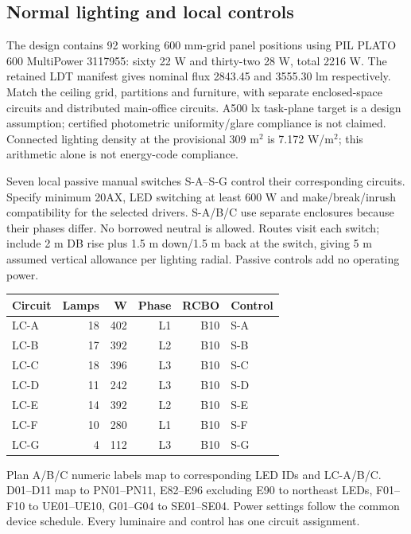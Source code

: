 {\fontsize{12}{14}\selectfont\tenantselection}
\subsection*{Normal lighting and local controls}
The design contains 92 working 600 mm-grid panel positions using PIL PLATO 600 MultiPower 3117955: sixty 22 W and thirty-two 28 W, total 2216 W. The retained LDT manifest gives nominal flux 2843.45 and 3555.30 lm respectively. Match the ceiling grid, partitions and furniture, with separate enclosed-space circuits and distributed main-office circuits. A500 lx task-plane target is a design assumption;  certified photometric uniformity/glare compliance is not claimed. Connected lighting density at the provisional 309 m$^2$ is 7.172 W/m$^2$;  this arithmetic alone is not energy-code compliance.

Seven local passive manual switches S-A--S-G control their corresponding circuits. Specify minimum 20AX, LED switching at least 600 W and make/break/inrush compatibility for the selected drivers. S-A/B/C use separate enclosures because their phases differ. No borrowed neutral is allowed. Routes visit each switch;  include 2 m DB rise plus 1.5 m down/1.5 m back at the switch, giving 5 m assumed vertical allowance per lighting radial. Passive controls add no operating power.
\begin{center}\begin{tabular}{lrrrrl}\toprule
Circuit & Lamps & W & Phase & RCBO & Control\\\midrule

LC-A & 18 & 402 & L1 & B10 & S-A \\
LC-B & 17 & 392 & L2 & B10 & S-B \\
LC-C & 18 & 396 & L3 & B10 & S-C \\
LC-D & 11 & 242 & L3 & B10 & S-D \\
LC-E & 14 & 392 & L2 & B10 & S-E \\
LC-F & 10 & 280 & L1 & B10 & S-F \\
LC-G & 4 & 112 & L3 & B10 & S-G \\

\bottomrule\end{tabular}\end{center}
Plan A/B/C numeric labels map to corresponding LED IDs and LC-A/B/C. D01--D11 map to PN01--PN11, E82--E96 excluding E90 to northeast LEDs, F01--F10 to UE01--UE10, G01--G04 to SE01--SE04. Power settings follow the common device schedule. Every luminaire and control has one circuit assignment.

